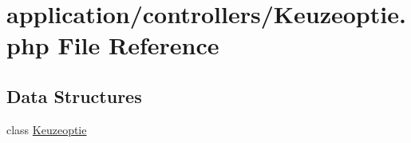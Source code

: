 \hypertarget{_keuzeoptie_8php}{}\section{application/controllers/\+Keuzeoptie.php File Reference}
\label{_keuzeoptie_8php}
\subsection*{Data Structures}
\begin{DoxyCompactItemize}
\item 
class \mbox{\hyperlink{class_keuzeoptie}{Keuzeoptie}}
\end{DoxyCompactItemize}

